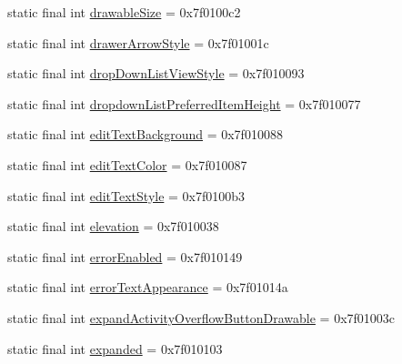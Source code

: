 \begin{CompactItemize}
\item 
static final int \hyperlink{classandroid_1_1support_1_1graphics_1_1drawable_1_1animated_1_1_r_1_1attr_4119ab1eee81b67b5d5a16f2e6a1efe2}{drawableSize} = 0x7f0100c2
\item 
static final int \hyperlink{classandroid_1_1support_1_1graphics_1_1drawable_1_1animated_1_1_r_1_1attr_f503ade04230b52dfea5e741d932d4ef}{drawerArrowStyle} = 0x7f01001c
\item 
static final int \hyperlink{classandroid_1_1support_1_1graphics_1_1drawable_1_1animated_1_1_r_1_1attr_b0607ae3c1e1126ad32ad720cd40ed6f}{dropDownListViewStyle} = 0x7f010093
\item 
static final int \hyperlink{classandroid_1_1support_1_1graphics_1_1drawable_1_1animated_1_1_r_1_1attr_fa61e1d9855564c8fee1b5a1908f1e3b}{dropdownListPreferredItemHeight} = 0x7f010077
\item 
static final int \hyperlink{classandroid_1_1support_1_1graphics_1_1drawable_1_1animated_1_1_r_1_1attr_df955b0e7bd15afe7a805c49c05b4a50}{editTextBackground} = 0x7f010088
\item 
static final int \hyperlink{classandroid_1_1support_1_1graphics_1_1drawable_1_1animated_1_1_r_1_1attr_e9ffb4163bd7b00d058ec357277b496b}{editTextColor} = 0x7f010087
\item 
static final int \hyperlink{classandroid_1_1support_1_1graphics_1_1drawable_1_1animated_1_1_r_1_1attr_dd7adff4a4af0a48ef66058e03c78857}{editTextStyle} = 0x7f0100b3
\item 
static final int \hyperlink{classandroid_1_1support_1_1graphics_1_1drawable_1_1animated_1_1_r_1_1attr_5ba1cf089950800aa2f1630daa5e692a}{elevation} = 0x7f010038
\item 
static final int \hyperlink{classandroid_1_1support_1_1graphics_1_1drawable_1_1animated_1_1_r_1_1attr_d0e734934638377d1c8707a9531464db}{errorEnabled} = 0x7f010149
\item 
static final int \hyperlink{classandroid_1_1support_1_1graphics_1_1drawable_1_1animated_1_1_r_1_1attr_e3de5aaab869e9bb143f91eb9f4d994e}{errorTextAppearance} = 0x7f01014a
\item 
static final int \hyperlink{classandroid_1_1support_1_1graphics_1_1drawable_1_1animated_1_1_r_1_1attr_be01875cb4e1275efb3009991baa9c60}{expandActivityOverflowButtonDrawable} = 0x7f01003c
\item 
static final int \hyperlink{classandroid_1_1support_1_1graphics_1_1drawable_1_1animated_1_1_r_1_1attr_9ba55cf938fda080271f5e274af1c62b}{expanded} = 0x7f010103
\item 

\end{CompactItemize}
